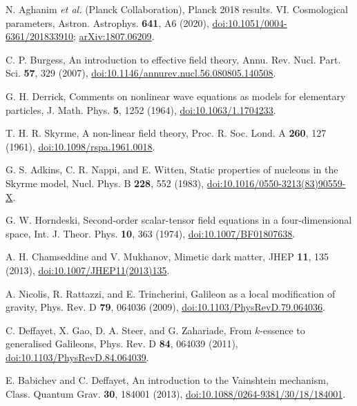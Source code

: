 \documentclass{article}
\begin{document}
\begin{thebibliography}{99}
N. Aghanim \emph{et al.} (Planck Collaboration), Planck 2018 results. VI. Cosmological parameters,
Astron. Astrophys. \textbf{641}, A6 (2020),
\href{https://doi.org/10.1051/0004-6361/201833910}{doi:10.1051/0004-6361/201833910};
\href{https://arxiv.org/abs/1807.06209}{arXiv:1807.06209}.

C. P. Burgess, An introduction to effective field theory, 
Annu. Rev. Nucl. Part. Sci. \textbf{57}, 329 (2007),
\href{https://doi.org/10.1146/annurev.nucl.56.080805.140508}{doi:10.1146/annurev.nucl.56.080805.140508}.

G. H. Derrick, Comments on nonlinear wave equations as models for elementary particles, 
J. Math. Phys. \textbf{5}, 1252 (1964),
\href{https://doi.org/10.1063/1.1704233}{doi:10.1063/1.1704233}.

T. H. R. Skyrme, A non-linear field theory, 
Proc. R. Soc. Lond. A \textbf{260}, 127 (1961),
\href{https://doi.org/10.1098/rspa.1961.0018}{doi:10.1098/rspa.1961.0018}.

G. S. Adkins, C. R. Nappi, and E. Witten, Static properties of nucleons in the Skyrme model, 
Nucl. Phys. B \textbf{228}, 552 (1983),
\href{https://doi.org/10.1016/0550-3213(83)90559-X}{doi:10.1016/0550-3213(83)90559-X}.

G. W. Horndeski, Second-order scalar-tensor field equations in a four-dimensional space, 
Int. J. Theor. Phys. \textbf{10}, 363 (1974),
\href{https://doi.org/10.1007/BF01807638}{doi:10.1007/BF01807638}.

A. H. Chamseddine and V. Mukhanov, Mimetic dark matter, 
JHEP \textbf{11}, 135 (2013),
\href{https://doi.org/10.1007/JHEP11(2013)135}{doi:10.1007/JHEP11(2013)135}.

A. Nicolis, R. Rattazzi, and E. Trincherini, Galileon as a local modification of gravity, 
Phys. Rev. D \textbf{79}, 064036 (2009),
\href{https://doi.org/10.1103/PhysRevD.79.064036}{doi:10.1103/PhysRevD.79.064036}.

C. Deffayet, X. Gao, D. A. Steer, and G. Zahariade, From $k$-essence to generalised Galileons, 
Phys. Rev. D \textbf{84}, 064039 (2011),
\href{https://doi.org/10.1103/PhysRevD.84.064039}{doi:10.1103/PhysRevD.84.064039}.

E. Babichev and C. Deffayet, An introduction to the Vainshtein mechanism,
Class. Quantum Grav. \textbf{30}, 184001 (2013),
\href{https://doi.org/10.1088/0264-9381/30/18/184001}{doi:10.1088/0264-9381/30/18/184001}.


\end{thebibliography}
\end{document}
